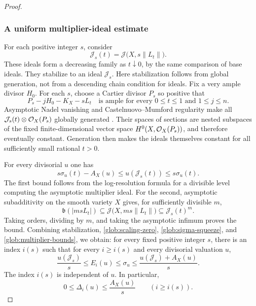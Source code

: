 \begin{proof}
\subsubsection*{A uniform multiplier-ideal estimate}
For each positive integer $s$, consider
\[
 \mathcal J_s(t)=\mathcal J\bigl(X,s\|L_t\|\bigr).
\]
These ideals form a decreasing family as $t\downarrow0$, by the same
comparison of base ideals.  They stabilize to an ideal $\mathcal J_s$.
Here stabilization follows from global generation, not from a descending
chain condition for ideals.  Fix a very ample divisor $H_0$.  For each
$s$, choose a Cartier divisor $P_s$ so positive that
\[
 P_s-jH_0-K_X-sL_t\quad\text{is ample for every }0\leq t\leq1
 \text{ and }1\leq j\leq n.
\]
Asymptotic Nadel vanishing and Castelnuovo--Mumford regularity make all
$\mathcal J_s(t)\otimes\mathcal O_X(P_s)$ globally generated
\cite[Corollary~1.5 and Theorem~1.8]{DEL}.  Their spaces of sections are nested subspaces of the
fixed finite-dimensional vector space $H^0(X,\mathcal O_X(P_s))$, and therefore
eventually constant.  Generation then makes the ideals themselves
constant for all sufficiently small rational $t>0$.

For every divisorial $u$ one has
\begin{equation}\label{glob:multiplier-bounds}
 s\sigma_u(t)-A_X(u)
 \leq u(\mathcal J_s(t))\leq s\sigma_u(t).
\end{equation}
The first bound follows from the log-resolution formula for a divisible
level computing the asymptotic multiplier ideal.  For the second,
asymptotic subadditivity on the smooth variety $X$
\cite[Variants~2.4--2.5]{DEL} gives, for sufficiently divisible $m$,
\[
 \mathfrak b(|msL_t|)
 \subseteq\mathcal J\bigl(X,ms\|L_t\|\bigr)
 \subseteq\mathcal J_s(t)^m.
\]
Taking orders, dividing by $m$, and taking the asymptotic infimum proves
the bound.  Combining stabilization, \eqref{glob:scaling-zero},
\eqref{glob:sigma-squeeze}, and \eqref{glob:multiplier-bounds}, we obtain:
for every fixed positive integer $s$, there is an index $i(s)$ such that
for every $i\geq i(s)$ and every divisorial valuation $u$,
\begin{equation}\label{glob:uniform-squeeze}
 \frac{u(\mathcal J_s)}{s}
 \leq E_i(u)\leq\sigma_u
 \leq\frac{u(\mathcal J_s)+A_X(u)}{s}.
\end{equation}
The index $i(s)$ is independent of $u$.  In particular,
\begin{equation}\label{glob:small-increment}
 0\leq\Delta_i(u)\leq\frac{A_X(u)}s
 \qquad(i\geq i(s)).
\end{equation}


\end{proof}
